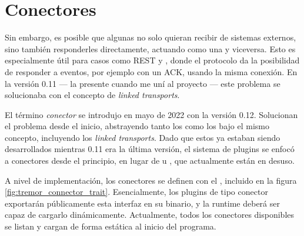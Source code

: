 \section{Conectores}

Sin embargo, es posible que algunas \onramps no solo quieran recibir de sistemas
externos, sino también responderles directamente, actuando como una \offramp y
viceversa. Esto es especialmente útil para casos como REST y \websockets, donde
el protocolo da la posibilidad de responder a eventos, por ejemplo con un ACK,
usando la misma conexión. En la versión 0.11 --- la presente cuando me uní al
proyecto --- este problema se solucionaba con el concepto de \emph{linked
transports}.

El término \emph{conector} se introdujo en mayo de 2022 con la versión 0.12.
Solucionan el problema desde el inicio, abstrayendo tanto los \onramps como los
\offramps bajo el mismo concepto, incluyendo los \emph{linked transports}. Dado
que estos ya estaban siendo desarrollados mientras 0.11 era la última versión,
el sistema de plugins se enfocó a conectores desde el principio, en lugar de
\onramps u \offramps, que actualmente están en desuso.

A nivel de implementación, los conectores se definen con el \trait
{}, incluido en la figura \ref{fig:tremor_connector_trait}.
Esencialmente, los plugins de tipo conector exportarán públicamente esta
interfaz en su binario, y la runtime deberá ser capaz de cargarlo dinámicamente.
Actualmente, todos los conectores disponibles se listan y cargan de forma
estática al inicio del programa.

